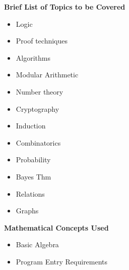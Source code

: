 {    \noindent \textbf{Brief List of Topics to be Covered}
    \begin{itemize}
        \item Logic
        \item Proof techniques
        \item Algorithms
        \item Modular Arithmetic
        \item Number theory
        \item Cryptography
        \item Induction
        \item Combinatorics
        \item Probability
        \item Bayes Thm
        \item Relations
        \item Graphs
    \end{itemize}

    \noindent \textbf{Mathematical Concepts Used}
    \begin{itemize}
        \item Basic Algebra
        \item Program Entry Requirements
    \end{itemize}
}

